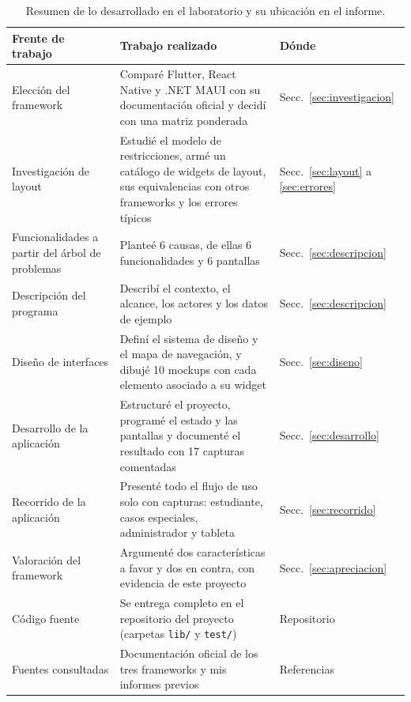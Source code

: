 \begin{table}[H]
	\centering\small
	\begin{tabularx}{\textwidth}{|p{4.2cm}|X|p{2.3cm}|}
		\hline
		\rowcolor{tablebackground}\color{white}\textbf{Frente de trabajo} & \color{white}\textbf{Trabajo realizado} & \color{white}\textbf{Dónde}\\
		\hline
		Elección del framework & Comparé Flutter, React Native y .NET MAUI con su documentación oficial y decidí con una matriz ponderada & Secc.~\ref{sec:investigacion} \\\hline
		Investigación de layout & Estudié el modelo de restricciones, armé un catálogo de widgets de layout, sus equivalencias con otros frameworks y los errores típicos & Secc.~\ref{sec:layout} a \ref{sec:errores} \\\hline
		Funcionalidades a partir del árbol de problemas & Planteé 6 causas, de ellas 6 funcionalidades y 6 pantallas & Secc.~\ref{sec:descripcion} \\\hline
		Descripción del programa & Describí el contexto, el alcance, los actores y los datos de ejemplo & Secc.~\ref{sec:descripcion} \\\hline
		Diseño de interfaces & Definí el sistema de diseño y el mapa de navegación, y dibujé 10 mockups con cada elemento asociado a su widget & Secc.~\ref{sec:diseno} \\\hline
		Desarrollo de la aplicación & Estructuré el proyecto, programé el estado y las pantallas y documenté el resultado con 17 capturas comentadas & Secc.~\ref{sec:desarrollo} \\\hline
		Recorrido de la aplicación & Presenté todo el flujo de uso solo con capturas: estudiante, casos especiales, administrador y tableta & Secc.~\ref{sec:recorrido} \\\hline
		Valoración del framework & Argumenté dos características a favor y dos en contra, con evidencia de este proyecto & Secc.~\ref{sec:apreciacion} \\\hline
		Código fuente & Se entrega completo en el repositorio del proyecto (carpetas \texttt{lib/} y \texttt{test/}) & Repositorio \\\hline
		Fuentes consultadas & Documentación oficial de los tres frameworks y mis informes previos & Referencias \\\hline
	\end{tabularx}
	\caption{Resumen de lo desarrollado en el laboratorio y su ubicación en el informe.}
	\label{tab:cumplimiento}
\end{table}

